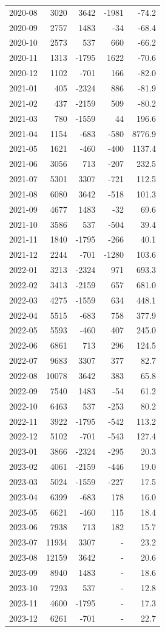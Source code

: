 \begin{longtable}{lrrrr}
2020-08 & 3020 & 3642 & -1981 & -74.2 \\
2020-09 & 2757 & 1483 & -34 & -68.4 \\
2020-10 & 2573 & 537 & 660 & -66.2 \\
2020-11 & 1313 & -1795 & 1622 & -70.6 \\
2020-12 & 1102 & -701 & 166 & -82.0 \\
2021-01 & 405 & -2324 & 886 & -81.9 \\
2021-02 & 437 & -2159 & 509 & -80.2 \\
2021-03 & 780 & -1559 & 44 & 196.6 \\
2021-04 & 1154 & -683 & -580 & 8776.9 \\
2021-05 & 1621 & -460 & -400 & 1137.4 \\
2021-06 & 3056 & 713 & -207 & 232.5 \\
2021-07 & 5301 & 3307 & -721 & 112.5 \\
2021-08 & 6080 & 3642 & -518 & 101.3 \\
2021-09 & 4677 & 1483 & -32 & 69.6 \\
2021-10 & 3586 & 537 & -504 & 39.4 \\
2021-11 & 1840 & -1795 & -266 & 40.1 \\
2021-12 & 2244 & -701 & -1280 & 103.6 \\
2022-01 & 3213 & -2324 & 971 & 693.3 \\
2022-02 & 3413 & -2159 & 657 & 681.0 \\
2022-03 & 4275 & -1559 & 634 & 448.1 \\
2022-04 & 5515 & -683 & 758 & 377.9 \\
2022-05 & 5593 & -460 & 407 & 245.0 \\
2022-06 & 6861 & 713 & 296 & 124.5 \\
2022-07 & 9683 & 3307 & 377 & 82.7 \\
2022-08 & 10078 & 3642 & 383 & 65.8 \\
2022-09 & 7540 & 1483 & -54 & 61.2 \\
2022-10 & 6463 & 537 & -253 & 80.2 \\
2022-11 & 3922 & -1795 & -542 & 113.2 \\
2022-12 & 5102 & -701 & -543 & 127.4 \\
2023-01 & 3866 & -2324 & -295 & 20.3 \\
2023-02 & 4061 & -2159 & -446 & 19.0 \\
2023-03 & 5024 & -1559 & -227 & 17.5 \\
2023-04 & 6399 & -683 & 178 & 16.0 \\
2023-05 & 6621 & -460 & 115 & 18.4 \\
2023-06 & 7938 & 713 & 182 & 15.7 \\
2023-07 & 11934 & 3307 & - & 23.2 \\
2023-08 & 12159 & 3642 & - & 20.6 \\
2023-09 & 8940 & 1483 & - & 18.6 \\
2023-10 & 7293 & 537 & - & 12.8 \\
2023-11 & 4600 & -1795 & - & 17.3 \\
2023-12 & 6261 & -701 & - & 22.7 \\
\end{longtable}
